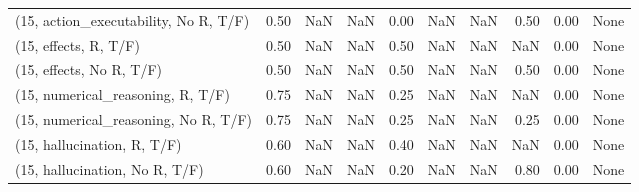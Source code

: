 \begin{table*}[h!]
\begin{adjustbox}{width=2\columnwidth,center}
\begin{tabular}{lrrr|rrr|rrr}
(15, action\_executability, No R, T/F) &                      0.50 &                   NaN &                       NaN &                          0.00 &                       NaN &                           NaN &                                   0.50 &                               0.00 &                                  None \\
(15, effects, R, T/F)                 &                      0.50 &                   NaN &                       NaN &                          0.50 &                       NaN &                           NaN &                                    NaN &                               0.00 &                                  None \\
(15, effects, No R, T/F)              &                      0.50 &                   NaN &                       NaN &                          0.50 &                       NaN &                           NaN &                                   0.50 &                               0.00 &                                  None \\
(15, numerical\_reasoning, R, T/F)     &                      0.75 &                   NaN &                       NaN &                          0.25 &                       NaN &                           NaN &                                    NaN &                               0.00 &                                  None \\
(15, numerical\_reasoning, No R, T/F)  &                      0.75 &                   NaN &                       NaN &                          0.25 &                       NaN &                           NaN &                                   0.25 &                               0.00 &                                  None \\
(15, hallucination, R, T/F)           &                      0.60 &                   NaN &                       NaN &                          0.40 &                       NaN &                           NaN &                                    NaN &                               0.00 &                                  None \\
(15, hallucination, No R, T/F)        &                      0.60 &                   NaN &                       NaN &                          0.20 &                       NaN &                           NaN &                                   0.80 &                               0.00 &                                  None \\

\end{tabular}
\end{adjustbox}
\end{table*}
